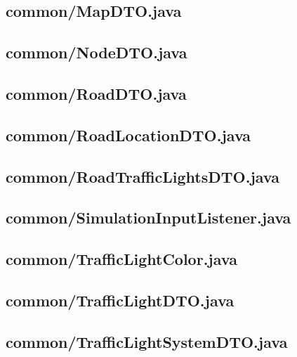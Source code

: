\subsection{common/MapDTO.java}

\newpage
\subsection{common/NodeDTO.java}

\newpage
\subsection{common/RoadDTO.java}

\newpage
\subsection{common/RoadLocationDTO.java}

\newpage
\subsection{common/RoadTrafficLightsDTO.java}

\newpage
\subsection{common/SimulationInputListener.java}

\newpage
\subsection{common/TrafficLightColor.java}

\newpage
\subsection{common/TrafficLightDTO.java}

\newpage
\subsection{common/TrafficLightSystemDTO.java}

\newpage
